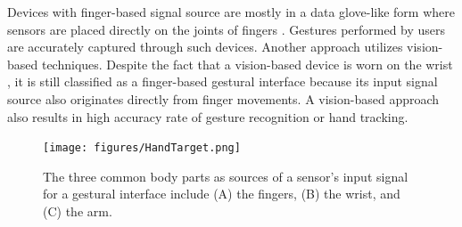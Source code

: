\documentclass{sigchi}
\begin{document}

Devices with finger-based signal source are mostly in a data glove-like form where sensors are placed directly on the joints of fingers \cite{4539650}. Gestures performed by users are accurately captured through such devices.
Another approach utilizes vision-based techniques. Despite the fact that a vision-based device is worn on the wrist \cite{Kim:2012:DFI:2380116.2380139}, it is still classified as a finger-based gestural interface because its input signal source also originates directly from finger movements. A vision-based approach also results in high accuracy rate of gesture recognition or hand tracking.

\begin{figure}
  \begin{center}
  \texttt{[image: figures/HandTarget.png]}
  \caption{The three common body parts as sources of a sensor's input signal for a gestural interface include (A) the fingers, (B) the wrist, and (C) the arm.}
  \label{fig:HandTarget}
  \end{center}
\end{figure}


\end{document}
